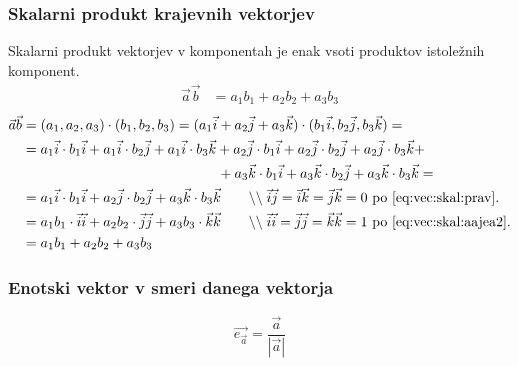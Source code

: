 \documentclass[a4paper,oneside,12pt,fleqn]{article}
\newcommand\krat\cdot
\newcommand{\comment}[1]{\ensuremath{\qquad\backslash\backslash\;}\textnormal{#1}}
\def\Vec{\overrightarrow}
\numberwithin{equation}{section}
\begin{document}
\subsubsection{Skalarni produkt krajevnih vektorjev}
\label{sec:vec:kraj:skal}
Skalarni produkt vektorjev v komponentah je enak vsoti produktov istoležnih komponent.
\boldmath
\begin{align*}
  \vec{a}\vec{b} &=  a_1b_1+a_2b_2+a_3b_3
\end{align*}
\unboldmath
\begin{align*}
  \vec{a}\vec{b} &=  (a_1,a_2,a_3)\krat(b_1,b_2,b_3) = (a_1\vec{i} + a_2\vec{j} +
  a_3\vec{k}) \krat (b_1\vec{i},b_2\vec{j},b_3\vec{k}) = \\
  &= a_1\vec{i}\krat b_1\vec{i} + a_1\vec{i}\krat b_2\vec{j} + a_1\vec{i}\krat b_3\vec{k}
  + a_2\vec{j}\krat b_1\vec{i} + a_2\vec{j}\krat b_2\vec{j} + a_2\vec{j}\krat b_3\vec{k} +
  \\ & \qquad \qquad \qquad \qquad \qquad \qquad \qquad + a_3\vec{k}\krat b_1\vec{i} + a_3\vec{k}\krat b_2\vec{j} + a_3\vec{k}\krat b_3\vec{k} = \\
  &= a_1\vec{i}\krat b_1\vec{i} + a_2\vec{j}\krat b_2\vec{j} + a_3\vec{k}\krat b_3\vec{k}
  \comment{$\vec{i}\vec{j} = \vec{i}\vec{k} = \vec{j}\vec{k} = 0$ po
  \eqref{eq:vec:skal:prav}.} \\
  &= a_1b_1\krat\vec{i}\vec{i} + a_2b_2\krat\vec{j}\vec{j} + a_3b_3\krat\vec{k}\vec{k}
  \comment{$\vec{i}\vec{i} = \vec{j}\vec{j} = \vec{k}\vec{k} = 1$ po
  \eqref{eq:vec:skal:aajea2}.} \\
  &= a_1b_1 + a_2b_2 + a_3b_3
\end{align*}

\subsubsection{Enotski vektor v smeri danega vektorja}
\label{sec:vec:kraj:enot}
\[ \Vec{e_{\vec{a}}} = \frac{\vec{a}}{\left| \vec{a} \right|} \]
\end{document}
